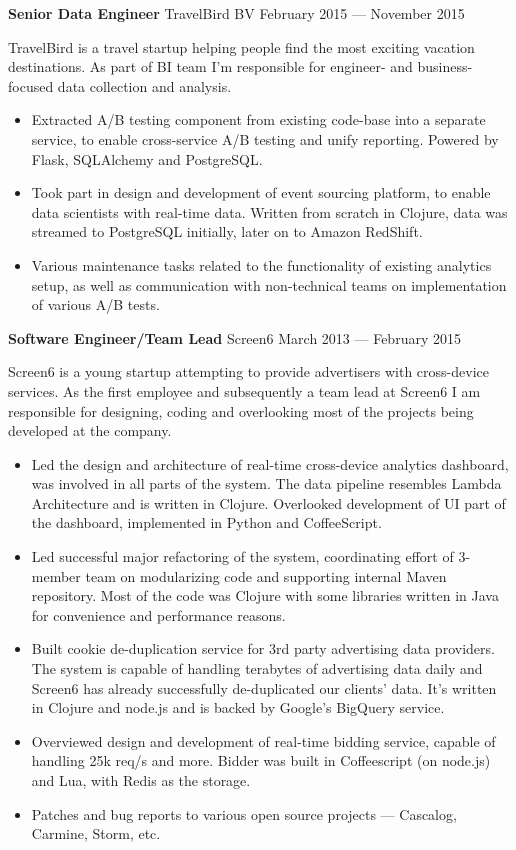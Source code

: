 \documentclass[margin]{res}
\begin{document}
\begin{resume}
{\bf Senior Data Engineer} TravelBird BV \hfill February 2015 --- November 2015

TravelBird is a travel startup helping people find the most exciting
vacation destinations. As part of BI team I'm responsible for
engineer- and business-focused data collection and analysis.\\

\begin{itemize} \itemsep -1pt
\item Extracted A/B testing component from existing code-base into a
  separate service, to enable cross-service A/B testing and unify
  reporting. Powered by Flask, SQLAlchemy and PostgreSQL.
\item Took part in design and development of event sourcing platform,
  to enable data scientists with real-time data. Written from scratch
  in Clojure, data was streamed to PostgreSQL initially, later on to
  Amazon RedShift.
\item Various maintenance tasks related to the functionality of
  existing analytics setup, as well as communication with
  non-technical teams on implementation of various A/B tests.
\end{itemize}

{\bf Software Engineer/Team Lead} Screen6 \hfill March 2013 --- February 2015

Screen6 is a young startup attempting to provide advertisers with
cross-device services. As the first employee and subsequently a team
lead at Screen6 I am responsible for designing, coding and overlooking
most of the projects being developed at the company.\\

\begin{itemize} \itemsep -1pt
\item Led the design and architecture of real-time cross-device
  analytics dashboard, was involved in all parts of the system. The
  data pipeline resembles Lambda Architecture and is written in
  Clojure. Overlooked development of UI part of the dashboard,
  implemented in Python and CoffeeScript.
\item Led successful major refactoring of the system, coordinating
  effort of 3-member team on modularizing code and supporting internal
  Maven repository. Most of the code was Clojure with some libraries
  written in Java for convenience and performance reasons.
\item Built cookie de-duplication service for 3rd party advertising
  data providers. The system is capable of handling terabytes of
  advertising data daily and Screen6 has already successfully
  de-duplicated our clients' data. It's written in Clojure and node.js
  and is backed by Google's BigQuery service.
\item Overviewed design and development of real-time bidding service,
  capable of handling 25k req/s and more. Bidder was built in
  Coffeescript (on node.js) and Lua, with Redis as the storage.
\item Patches and bug reports to various open source projects ---
  Cascalog, Carmine, Storm, etc.
\end{itemize}


\end{resume}
\end{document}
